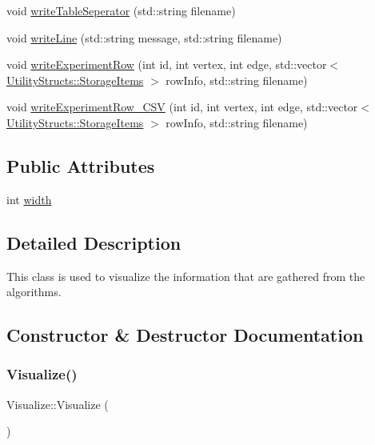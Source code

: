\begin{DoxyCompactItemize}
void \hyperlink{class_visualize_ac5530b8e917c748163e621cf5677eeb5}{write\+Table\+Seperator} (std\+::string filename)
\item 
void \hyperlink{class_visualize_a9ccde29aab876a829335775898373e96}{write\+Line} (std\+::string message, std\+::string filename)
\item 
void \hyperlink{class_visualize_a8aefacec622221533485db6701d1119e}{write\+Experiment\+Row} (int id, int vertex, int edge, std\+::vector$<$ \hyperlink{struct_utility_structs_1_1_storage_items}{Utility\+Structs\+::\+Storage\+Items} $>$ row\+Info, std\+::string filename)
\item 
void \hyperlink{class_visualize_a8677a063c82af1b37b94c7d3a3ca3746}{write\+Experiment\+Row\+\_\+\+C\+SV} (int id, int vertex, int edge, std\+::vector$<$ \hyperlink{struct_utility_structs_1_1_storage_items}{Utility\+Structs\+::\+Storage\+Items} $>$ row\+Info, std\+::string filename)
\end{DoxyCompactItemize}
\subsection*{Public Attributes}
\begin{DoxyCompactItemize}
\item 
int \hyperlink{class_visualize_af5ac723ad5f8fe8c4a8378bf1299cda7}{width}
\end{DoxyCompactItemize}


\subsection{Detailed Description}
This class is used to visualize the information that are gathered from the algorithms. 

\subsection{Constructor \& Destructor Documentation}
\mbox{\label{class_visualize_a8d4163ad53518ec0c8a3eaec2bf2fe7b}} 
\subsubsection{\texorpdfstring{Visualize()}{Visualize()}}
{\footnotesize\ttfamily Visualize\+::\+Visualize (\begin{DoxyParamCaption}{ }\end{DoxyParamCaption})\hspace{0.3cm}{\ttfamily [inline]}}



